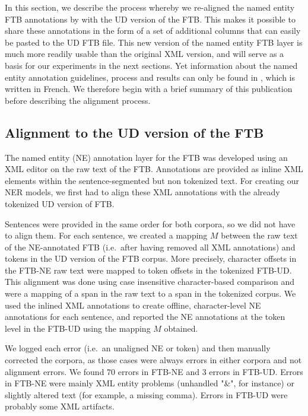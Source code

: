 In this section, we describe the process whereby we re-aligned the named entity FTB annotations by  with the UD version of the FTB. This makes it possible to share these annotations in the form of a set of additional columns that can easily be pasted to the UD FTB file. This new version of the named entity FTB layer is much more readily usable than the original XML version, and will serve as a basis for our experiments in the next sections.
Yet information about the named entity annotation guidelines, process and results can only be found in , which is written in French. We therefore begin with a brief summary of this publication before describing the alignment process.


\subsection{Alignment to the UD version of the FTB}
\label{subsec:alignment}

The named entity (NE) annotation layer for the FTB was developed using an XML editor on the raw text of the FTB. Annotations are provided as inline XML elements within the sentence-segmented but non tokenized text. For creating our NER models, we first had to align these XML annotations with the already tokenized UD version of FTB.

Sentences were provided in the same order for both corpora, so we did not have to align them.
For each sentence, we created a mapping $M$ between the raw text of the NE-annotated FTB (i.e.~after having removed all XML annotations) and tokens in the UD version of the FTB corpus. More precisely, character offsets in the FTB-NE raw text were mapped to token offsets in the tokenized FTB-UD.
This alignment was done using case insensitive character-based comparison and were a mapping of a span in the raw text to a span in the tokenized corpus.
We used the inlined XML annotations to create offline, character-level NE annotations for each sentence, and reported the NE annotations at the token level in the FTB-UD using the mapping $M$ obtained.

We logged each error (i.e.~an unaligned NE or token) and then manually corrected the corpora, as those cases were always errors in either corpora and not alignment errors. We found 70 errors in FTB-NE and 3 errors in FTB-UD. Errors in FTB-NE were mainly XML entity problems (unhandled "\&", for instance) or slightly altered text (for example, a missing comma). Errors in FTB-UD were probably some XML artifacts.
